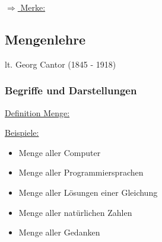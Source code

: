             \underline{$\Rightarrow$ Merke:} 
    \subsection{Mengenlehre}
        lt. Georg Cantor (1845 - 1918)
            \subsubsection{Begriffe und Darstellungen}
                \underline{Definition Menge:} 

                \underline{Beispiele:}
                    \begin{itemize}[leftmargin=*]
                        \item Menge aller Computer
                        \item Menge aller Programmiersprachen
                        \item Menge aller Lösungen einer Gleichung
                        \item Menge aller natürlichen Zahlen
                        \item Menge aller Gedanken
                    \end{itemize}

